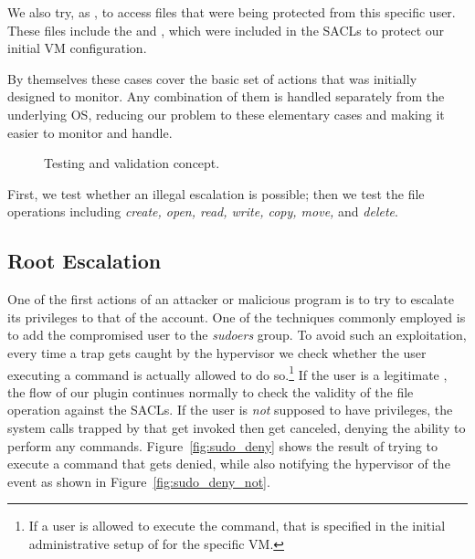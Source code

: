\par We also try, as , to access files that were being protected from this specific user. These files include the  and , which were included in the \acp{SACL} to protect our initial \ac{VM} configuration.

\par By themselves these cases cover the basic set of actions that  was initially designed to monitor. Any combination of them is handled separately from the underlying \ac{OS}, reducing our problem to these elementary cases and making it easier to monitor and handle.

\begin{figure}[ht]
	\centering
	
	\caption{Testing and validation concept.}
	\label{fig:attack}
\end{figure} 

\par First, we test whether an illegal  escalation is possible; then we test the file operations including \emph{create, open, read, write, copy, move,} and \emph{delete}.

\subsection{Root Escalation}

\par One of the first actions of an attacker or malicious program is to try to escalate its privileges to that of the  account. One of the techniques commonly employed is to add the compromised user to the \emph{sudoers} group. To avoid such an exploitation, every time a trap gets caught by the hypervisor we check whether the user executing a  command is actually allowed to do so.\footnote{If a user is allowed to execute the  command, that is specified in the initial administrative setup of  for the specific \ac{VM}.} If the user is a legitimate , the flow of our plugin continues normally to check the validity of the file operation against the \acp{SACL}. If the user is \emph{not} supposed to have  privileges, the system calls trapped by  that get invoked then get canceled, denying the ability to perform any  commands. Figure~\ref{fig:sudo_deny} shows the result of trying to execute a  command that gets denied, while also notifying the hypervisor of the event as shown in Figure~\ref{fig:sudo_deny_not}.

